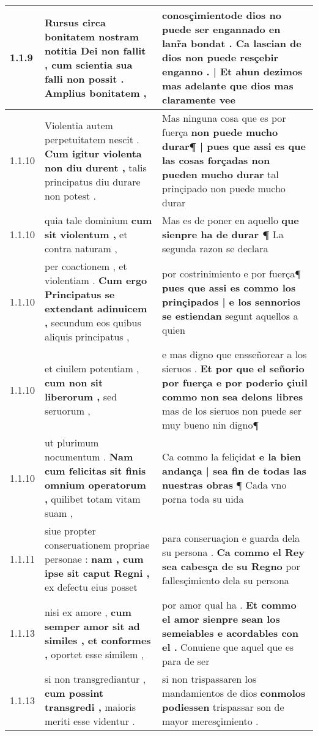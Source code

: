 \begin{tabular}{|p{1cm}|p{6.5cm}|p{6.5cm}|}
1.1.9 & Rursus circa bonitatem nostram notitia Dei non fallit , \textbf{ cum scientia sua falli non possit . } Amplius bonitatem , & conosçimientode dios no puede ser engannado en lanr̃a bondat . \textbf{ Ca lascian de dios non puede resçebir enganno . | Et ahun dezimos mas adelante } que dios mas claramente vee \\\hline
1.1.10 & Violentia autem perpetuitatem nescit . \textbf{ Cum igitur violenta non diu durent , } talis principatus diu durare non potest . & Mas ninguna cosa que es por fuerça \textbf{ non puede mucho durar¶ | pues que assi es que las cosas forçadas non pueden mucho durar } tal prinçipado non puede mucho durar \\\hline
1.1.10 & quia tale dominium \textbf{ cum sit violentum , } et contra naturam , & Mas es de poner en aquello \textbf{ que sienpre ha de durar ¶ } La segunda razon se declara \\\hline
1.1.10 & per coactionem , et violentiam . \textbf{ Cum ergo Principatus se extendant adinuicem , } secundum eos quibus aliquis principatus , & por costrinimiento e por fuerça¶ \textbf{ pues que assi es commo los prinçipados | e los sennorios se estiendan } segunt aquellos a quien \\\hline
1.1.10 & et ciuilem potentiam , \textbf{ cum non sit liberorum , } sed seruorum , & e mas digno que ensseñorear a los sieruos . \textbf{ Et por que el señorio por fuerça e por poderio çiuil commo non sea delons libres } mas de los sieruos non puede ser muy bueno nin digno¶ \\\hline
1.1.10 & ut plurimum nocumentum . \textbf{ Nam cum felicitas sit finis omnium operatorum , } quilibet totam vitam suam , & Ca commo la feliçidat \textbf{ e la bien andança | sea fin de todas las nuestras obras } ¶ Cada vno porna toda su uida \\\hline
1.1.11 & siue propter conseruationem propriae personae : \textbf{ nam , cum ipse sit caput Regni , } ex defectu eius posset & para conseruaçion e guarda dela su persona . \textbf{ Ca commo el Rey sea cabesça de su Regno } por fallesçimiento dela su persona \\\hline
1.1.13 & nisi ex amore , \textbf{ cum semper amor sit ad similes , et conformes , } oportet esse similem , & por amor qual ha . \textbf{ Et commo el amor sienpre sean los semeiables e acordables con el . } Conuiene que aquel que es para de ser \\\hline
1.1.13 & si non transgrediantur , \textbf{ cum possint transgredi , } maioris meriti esse videntur . & si non trispassaren los mandamientos de dios \textbf{ conmolos podiessen } trispassar son de mayor meresçimiento . \\\hline

\end{tabular}
